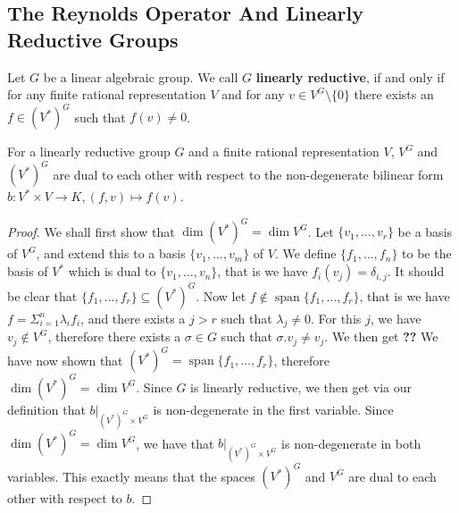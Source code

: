 \subsection{The Reynolds Operator And Linearly Reductive Groups}

\begin{definition}
  Let $G$ be a linear algebraic group.
  We call $G$ \textbf{linearly reductive}, if and only if for any finite rational representation $V$ and for any $v \in V^G \setminus \{ 0 \}$ there exists an $f \in \left( V^\ast \right)^G $ such that $f(v) \neq 0$.
\end{definition}

\begin{proposition}\label{dual}
  For a linearly reductive group $G$ and a finite rational representation $V$, $V^G$ and $(V^\ast)^G$ are dual to each other with respect to the non-degenerate bilinear form $ b\colon V^\ast \times V \longrightarrow K, (f,v) \mapsto f(v)$.
\end{proposition}

\begin{proof}
  We shall first show that $\operatorname{dim}(V^\ast)^G = \operatorname{dim}V^G$.
  Let $\{v_1, \ldots , v_r \}$ be a basis of $V^G$, and extend this to a basis $\{v_1, \ldots , v_m \}$ of $V$.
  We define $\{ f_1 , \ldots , f_n \}$ to be the basis of $V^\ast$ which is dual to $\{v_1, \ldots , v_n \}$, that is we have $ f_i (v_j) = \delta_{i,j} $.
  It should be clear that $\{f_1, \ldots , f_r \} \subseteq (V^\ast)^G$.
  Now let $f \notin \operatorname{span} \{ f_1, \ldots, f_r\}$, that is we have $f = \Sigma_{i=1}^n \lambda_i f_i $, and there exists a $j > r$ such that $ \lambda_j \neq 0$.
  For this $j$, we have $v_j \notin V^G$, therefore there exists a $\sigma \in G$ such that $\sigma . v_j \neq v_j$.
  We then get \textbf{??}
  We have now shown that $(V^\ast)^G = \operatorname{span}\{f_1,\dots,f_r\}$, therefore $\operatorname{dim}(V^\ast)^G = \operatorname{dim}V^G$.
  Since $G$ is linearly reductive, we then get via our definition that $\left. b \right|_{(V^\ast)^G \times V^G}$ is non-degenerate in the first variable.
  Since $\operatorname{dim}(V^\ast)^G = \operatorname{dim}V^G$, we have that $\left. b \right|_{(V^\ast)^G \times V^G}$ is non-degenerate in both variables.
  This exactly means that the spaces $(V^\ast)^G$ and $V^G$ are dual to each other with respect to $b$.
\end{proof}


